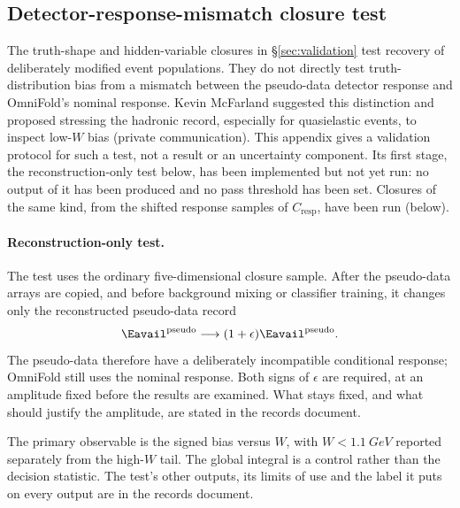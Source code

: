 \subsection{Detector-response-mismatch closure test}
\label{app:response-mismatch}

The truth-shape and hidden-variable closures in \S\ref{sec:validation} test recovery of deliberately modified event populations. They do not directly test truth-distribution bias from a mismatch between the pseudo-data detector response and OmniFold's nominal response. Kevin McFarland suggested this distinction and proposed stressing the hadronic record, especially for quasielastic events, to inspect low-$W$ bias (private communication). This appendix gives a validation protocol for such a test, not a result or an uncertainty component. Its first stage, the reconstruction-only test below, has been implemented but not yet run: no output of it has been produced and no pass threshold has been set. Closures of the same kind, from the shifted response samples of $C_{\mathrm{resp}}$, have been run (below).

\paragraph{Reconstruction-only test.} The test uses the ordinary five-dimensional closure sample. After the pseudo-data arrays are copied, and before background mixing or classifier training, it changes only the reconstructed pseudo-data record
\begin{equation}
  \Eavail^{\mathrm{pseudo}} \longrightarrow
  (1+\epsilon)\Eavail^{\mathrm{pseudo}} .
\end{equation}
The pseudo-data therefore have a deliberately incompatible conditional response; OmniFold still uses the nominal response. Both signs of $\epsilon$ are required, at an amplitude fixed before the results are examined. What stays fixed, and what should justify the amplitude, are stated in the records document.

The primary observable is the signed bias versus $W$, with $W<\SI{1.1}{GeV}$ reported separately from the high-$W$ tail. The global integral is a control rather than the decision statistic. The test's other outputs, its limits of use and the label it puts on every output are in the records document.

